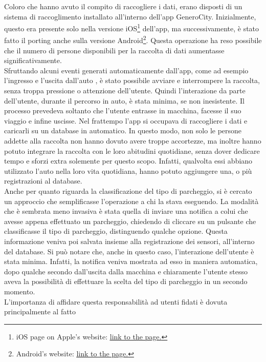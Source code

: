 Coloro che hanno avuto il compito di raccogliere i dati, erano disposti di un sistema di
raccoglimento installato all'interno dell'app GeneroCity. Inizialmente, questo era presente
solo nella versione iOS\footnote{iOS page on Apple's website: 
\href{https://www.apple.com/ios}{\underline{link to the page.}}} dell'app, 
ma successivamente, è stato fatto il porting anche sulla
versione Android\footnote{Android's website: 
\href{https://www.android.com}{\underline{link to the page.}}}.
Questa operazione ha reso possibile che il numero di persone disponibili
per la raccolta di dati aumentasse significativamente.\\
Sfruttando alcuni eventi generati automaticamente dall'app, come ad esempio l'ingresso e
l'uscita dall'auto \cite{framework_user_experience_car}, è stato possibile avviare e 
interrompere la raccolta, senza troppa pressione o attenzione dell'utente. Quindi l'interazione
da parte dell'utente,
durante il percorso in auto, è stata minima, se non inesistente. Il processo prevedeva soltanto
che l'utente entrasse in macchina, facesse il suo viaggio e infine uscisse. Nel frattempo 
l'app si occupava di raccogliere i dati e caricarli su un database in automatico. In questo
modo, non solo le persone addette alla raccolta non hanno dovuto avere troppe accortezze, ma
inoltre hanno potuto integrare la raccolta con le loro abitudini quotidiane, senza dover
dedicare tempo e sforzi extra solemente per questo scopo. Infatti, qualvolta essi abbiano
utilizzato l'auto nella loro vita quotidiana, hanno potuto aggiungere una, o più registrazioni
al database. \\
Anche per quanto riguarda la classificazione del tipo di parcheggio, si è cercato un approccio
che semplificasse l'operazione a chi la stava eseguendo. La modalità che è sembrata meno 
invasiva è stata quella di inviare una notifica a colui che avesse appena effettuato un
parcheggio, chiedendo di cliccare su un pulsante che classificasse il tipo di parcheggio, 
distinguendo qualche opzione. Questa informazione veniva poi salvata insieme alla registrazione
dei sensori, all'interno del database. Si può notare che, anche in questo caso, l'interazione
dell'utente è stata minima. Infatti, la notifica veniva mostrata ad esso in maniera automatica,
dopo qualche secondo dall'uscita dalla macchina e chiaramente l'utente stesso aveva la possibilità
di effettuare la scelta del tipo di parcheggio in un secondo momento.\\
L'importanza di affidare questa responsabilità ad utenti fidati è dovuta principalmente al fatto

